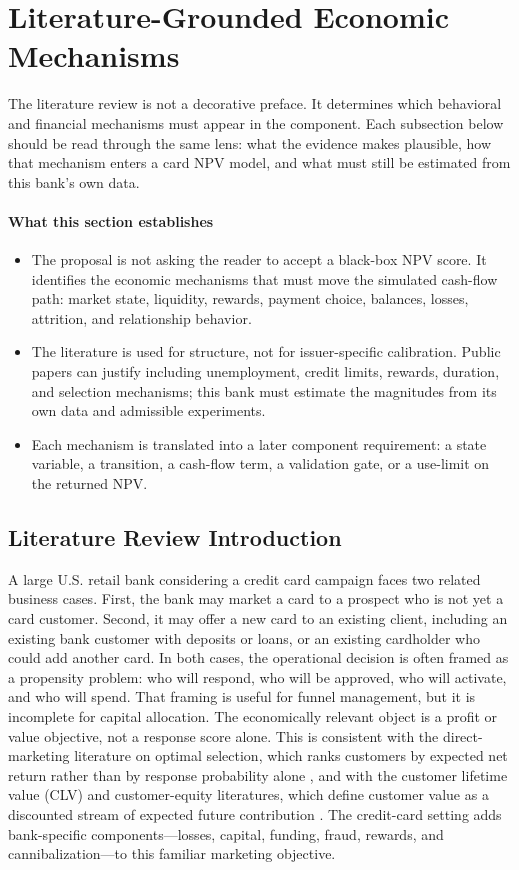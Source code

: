 \documentclass[11pt]{article}
\newcommand{\1}{\mathbf{1}}
\newcommand{\readerbox}[2]{\paragraph{#1}\begin{itemize}[leftmargin=1.5em,itemsep=0.1em,topsep=0.15em]#2\end{itemize}}
\begin{document}
\section{Literature-Grounded Economic Mechanisms}
\label{sec:v4-literature-mechanisms}

The literature review is not a decorative preface.  It determines which
behavioral and financial mechanisms must appear in the component.  Each
subsection below should be read through the same lens: what the evidence makes
plausible, how that mechanism enters a card NPV model, and what must still be
estimated from this bank's own data.

\readerbox{What this section establishes}{
  \item The proposal is not asking the reader to accept a black-box NPV score.
        It identifies the economic mechanisms that must move the simulated
        cash-flow path: market state, liquidity, rewards, payment choice,
        balances, losses, attrition, and relationship behavior.
  \item The literature is used for structure, not for issuer-specific
        calibration. Public papers can justify including unemployment, credit
        limits, rewards, duration, and selection mechanisms; this bank must
        estimate the magnitudes from its own data and admissible experiments.
  \item Each mechanism is translated into a later component requirement:
        a state variable, a transition, a cash-flow term, a validation gate, or
        a use-limit on the returned NPV.
}

\subsection{Literature Review Introduction}

A large U.S. retail bank considering a credit card campaign faces two related
business cases. First, the bank may market a card to a prospect who is not yet a
card customer. Second, it may offer a new card to an existing client, including
an existing bank customer with deposits or loans, or an existing cardholder who
could add another card. In both cases, the operational decision is often framed
as a propensity problem: who will respond, who will be approved, who will
activate, and who will spend. That framing is useful for funnel management, but
it is incomplete for capital allocation. The economically relevant object is a
profit or value objective, not a response score alone. This is consistent with
the direct-marketing literature on optimal selection, which ranks customers by
expected net return rather than by response probability alone
\citep{bult1995directmail}, and with the customer lifetime value (CLV) and
customer-equity literatures, which define customer value as a discounted stream
of expected future contribution \citep{berger1998clv,rust2004return,venkatesan2004clv}.
The credit-card setting adds bank-specific components---losses, capital,
funding, fraud, rewards, and cannibalization---to this familiar marketing
objective.
\end{document}
